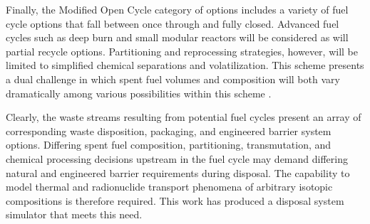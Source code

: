 
Finally, the Modified Open Cycle category of options includes a variety of fuel 
cycle options that fall between once through and fully closed. Advanced fuel 
cycles such as deep burn and small modular reactors will be considered as will 
partial recycle options.  Partitioning and reprocessing strategies, however, 
will be limited to simplified chemical separations and volatilization. This 
scheme presents a dual challenge in which spent fuel volumes 
and composition will both vary dramatically among various possibilities within 
this scheme \cite{doe_nuclear_2010} .


Clearly, the waste streams resulting from potential fuel cycles present an 
array of corresponding waste disposition, packaging, and engineered barrier 
system options. Differing spent fuel composition, partitioning, transmutation, 
and chemical processing decisions upstream in the fuel cycle may demand differing 
natural and engineered barrier requirements during disposal. The 
capability to model thermal and radionuclide transport phenomena of 
arbitrary isotopic compositions is therefore required. This work has produced a 
disposal system simulator that meets this need. 

